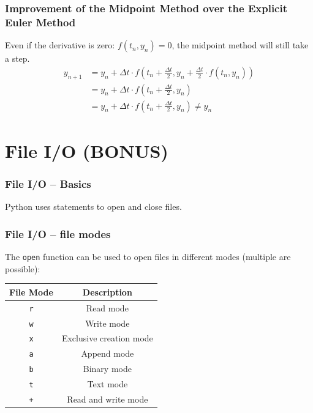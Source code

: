 \documentclass{beamer}
\begin{document}
\begin{frame}
    \frametitle{Improvement of the Midpoint Method over the Explicit Euler Method}
    Even if the derivative is zero: $ f(t_n, y_n) = 0 $, the midpoint method will still take a step.\\
    \vspace{5mm}
    \begin{align*}
        y_{n + 1} &= y_n + \Delta t \cdot f\left(t_n + \frac{\Delta t}{2}, y_n + \frac{\Delta t}{2} \cdot f(t_n, y_n)\right) \\
        &= y_n + \Delta t \cdot f\left(t_n + \frac{\Delta t}{2}, y_n\right) \\
        &= y_n + \Delta t \cdot f\left(t_n + \frac{\Delta t}{2}, y_n\right) \neq y_n
    \end{align*}
\end{frame}




\section{File I/O (BONUS)}
\begin{frame}
  \frametitle{File I/O -- Basics}
  Python uses  statements to open and close files.\\
  
\end{frame}
\begin{frame}
  \frametitle{File I/O -- file modes}
  The \texttt{open} function can be used to open files in different modes (multiple are possible):\\
  \begin{table}[h]
  \centering
  \begin{tabular}{|c|c|}
  \hline
  \textbf{File Mode} & \textbf{Description} \\ \hline
  \texttt{r} & Read mode \\ \hline
  \texttt{w} & Write mode \\ \hline
  \texttt{x} & Exclusive creation mode \\ \hline
  \texttt{a} & Append mode \\ \hline
  \texttt{b} & Binary mode \\ \hline
  \texttt{t} & Text mode \\ \hline
  \texttt{+} & Read and write mode \\ \hline
  \end{tabular}
  \label{tab:file-modes}
  \end{table}
\end{frame}
\end{document}
